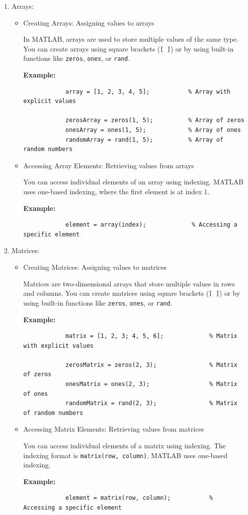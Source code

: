 \documentclass[
11pt, %
a4paper, %
oneside, %
headinclude,footinclude, %
BCOR5mm, %
]{scrartcl}
\begin{document}
\begin{enumerate}
	\item Arrays:
	\begin{itemize}
		\item Creating Arrays: Assigning values to arrays
		
		In MATLAB, arrays are used to store multiple values of the same type. You can create arrays using square brackets (\texttt{[ ]}) or by using built-in functions like \texttt{zeros}, \texttt{ones}, or \texttt{rand}.
		
		\textbf{Example:}
		\begin{verbatim}
			array = [1, 2, 3, 4, 5];           % Array with explicit values
			
			zerosArray = zeros(1, 5);          % Array of zeros
			onesArray = ones(1, 5);            % Array of ones
			randomArray = rand(1, 5);          % Array of random numbers
		\end{verbatim}
		
		\item Accessing Array Elements: Retrieving values from arrays
		
		You can access individual elements of an array using indexing. MATLAB uses one-based indexing, where the first element is at index 1.
		
		\textbf{Example:}
		\begin{verbatim}
			element = array(index);             % Accessing a specific element
		\end{verbatim}
	\end{itemize}
	
	\item Matrices:
	\begin{itemize}
		\item Creating Matrices: Assigning values to matrices
		
		Matrices are two-dimensional arrays that store multiple values in rows and columns. You can create matrices using square brackets (\texttt{[ ]}) or by using built-in functions like \texttt{zeros}, \texttt{ones}, or \texttt{rand}.
		
		\textbf{Example:}
		\begin{verbatim}
			matrix = [1, 2, 3; 4, 5, 6];             % Matrix with explicit values
			
			zerosMatrix = zeros(2, 3);               % Matrix of zeros
			onesMatrix = ones(2, 3);                 % Matrix of ones
			randomMatrix = rand(2, 3);               % Matrix of random numbers
		\end{verbatim}
		
		\item Accessing Matrix Elements: Retrieving values from matrices
		
		You can access individual elements of a matrix using indexing. The indexing format is \texttt{matrix(row, column)}. MATLAB uses one-based indexing.
		
		\textbf{Example:}
		\begin{verbatim}
			element = matrix(row, column);           % Accessing a specific element
		\end{verbatim}
	\end{itemize}
\end{enumerate}
\end{document}

